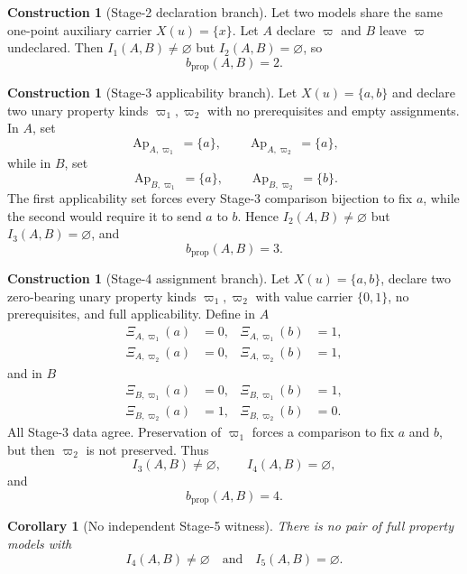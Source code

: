 \documentclass[11pt]{article}
\newcommand{\Ap}{\operatorname{Ap}}
\newtheorem{corollary}[theorem]{Corollary}
\theoremstyle{definition}
\newtheorem{construction}[theorem]{Construction}
\theoremstyle{remark}
\begin{document}
\begin{construction}[Stage-2 declaration branch]
Let two models share the same one-point auxiliary carrier \(X(u)=\{x\}\).
Let \(A\) declare \(\varpi\) and \(B\) leave \(\varpi\) undeclared.
Then \(I_1(A,B)\neq\varnothing\) but \(I_2(A,B)=\varnothing\), so
\[
b_{\mathrm{prop}}(A,B)=2.
\]
\end{construction}

\begin{construction}[Stage-3 applicability branch]
Let \(X(u)=\{a,b\}\) and declare two unary property kinds \(\varpi_1,\varpi_2\) with no prerequisites and empty assignments.
In \(A\), set
\[
\Ap_{A,\varpi_1}=\{a\},
\qquad
\Ap_{A,\varpi_2}=\{a\},
\]
while in \(B\), set
\[
\Ap_{B,\varpi_1}=\{a\},
\qquad
\Ap_{B,\varpi_2}=\{b\}.
\]
The first applicability set forces every Stage-3 comparison bijection to fix \(a\), while the second would require it to send \(a\) to \(b\).
Hence \(I_2(A,B)\neq\varnothing\) but \(I_3(A,B)=\varnothing\), and
\[
b_{\mathrm{prop}}(A,B)=3.
\]
\end{construction}

\begin{construction}[Stage-4 assignment branch]
Let \(X(u)=\{a,b\}\), declare two zero-bearing unary property kinds \(\varpi_1,\varpi_2\) with value carrier \(\{0,1\}\), no prerequisites, and full applicability.
Define in \(A\)
\[
\begin{aligned}
\Xi_{A,\varpi_1}(a)&=0,&\Xi_{A,\varpi_1}(b)&=1,\\
\Xi_{A,\varpi_2}(a)&=0,&\Xi_{A,\varpi_2}(b)&=1,
\end{aligned}
\]
and in \(B\)
\[
\begin{aligned}
\Xi_{B,\varpi_1}(a)&=0,&\Xi_{B,\varpi_1}(b)&=1,\\
\Xi_{B,\varpi_2}(a)&=1,&\Xi_{B,\varpi_2}(b)&=0.
\end{aligned}
\]
All Stage-3 data agree.
Preservation of \(\varpi_1\) forces a comparison to fix \(a\) and \(b\), but then \(\varpi_2\) is not preserved.
Thus
\[
I_3(A,B)\neq\varnothing,
\qquad
I_4(A,B)=\varnothing,
\]
and
\[
b_{\mathrm{prop}}(A,B)=4.
\]
\end{construction}

\begin{corollary}[No independent Stage-5 witness]
There is no pair of full property models with
\[
I_4(A,B)\neq\varnothing
\quad\text{and}\quad
I_5(A,B)=\varnothing.
\]
\end{corollary}

\end{document}

